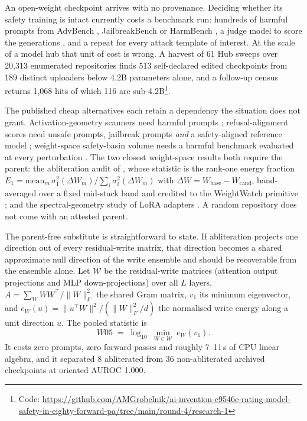 \documentclass[11pt,letterpaper]{article}
\begin{document}
An open-weight checkpoint arrives with no provenance. Deciding whether its safety training is intact currently costs a benchmark run: hundreds of harmful prompts from AdvBench \citep{Zou2023}, JailbreakBench \citep{Chao2024} or HarmBench \citep{Mazeika2024}, a judge model to score the generations \citep{Zheng2023}, and a repeat for every attack template of interest. At the scale of a model hub that unit of cost is wrong. A harvest of 61 Hub sweeps over 20,313 enumerated repositories finds 513 self-declared edited checkpoints from 189 distinct uploaders below 4.2B parameters alone, and a follow-up census returns 1,068 hits of which 116 are sub-4.2B\footnote{Code: \url{https://github.com/AMGrobelnik/ai-invention-c9546e-rating-model-safety-in-eighty-forward-pa/tree/main/round-4/research-1}}.

The published cheap alternatives each retain a dependency the situation does not grant. Activation-geometry scanners need harmful prompts \citep{Messenger2026}; refusal-alignment scores need unsafe prompts, jailbreak prompts \emph{and} a safety-aligned reference model \citep{Huang2026}; weight-space safety-basin volume needs a harmful benchmark evaluated at every perturbation \citep{Peng2024}. The two closest weight-space results both require the parent: the abliteration audit of \citet{Hurtado2026}, whose statistic is the rank-one energy fraction $E_1 = \mathrm{mean}_m\,\sigma_1^2(\Delta W_m)/\sum_i \sigma_i^2(\Delta W_m)$ with $\Delta W = W_{\text{base}} - W_{\text{cand}}$, band-averaged over a fixed mid-stack band and credited to the WeightWatch primitive \citep{Zhong2025}; and the spectral-geometry study of LoRA adapters \citep{Paul2026}. A random repository does not come with an attested parent.

The parent-free substitute is straightforward to state. If abliteration \citep{Arditi2024, Labonne2024} projects one direction out of every residual-write matrix, that direction becomes a shared approximate null direction of the write ensemble and should be recoverable from the ensemble alone. Let $\mathcal{W}$ be the residual-write matrices (attention output projections and MLP down-projections) over all $L$ layers, $A = \sum_{W} WW^\top/\lVert W\rVert_F^2$ the shared Gram matrix, $v_1$ its minimum eigenvector, and $e_W(u) = \lVert u^\top W\rVert^2/(\lVert W\rVert_F^2/d)$ the normalised write energy along a unit direction $u$. The pooled statistic is
\[
W05 \;=\; \log_{10}\ \min_{W\in\mathcal{W}}\ e_W(v_1).
\]
It costs zero prompts, zero forward passes and roughly 7--11\,s of CPU linear algebra, and it separated 8 abliterated from 36 non-abliterated archived checkpoints at oriented AUROC 1.000.
\end{document}
